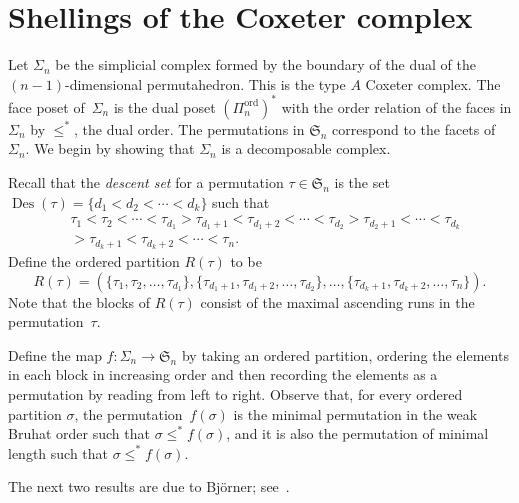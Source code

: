 \documentclass[10pt]{amsart}
\theoremstyle{definition}
\newcommand{\Sym}{\mathfrak{S}}
\DeclareMathOperator{\Des}{Des}
\DeclareMathOperator{\ord}{ord}
\newcommand{\Qn}{\Pi^{\ord}_{n}}
\begin{document}
\section{Shellings of the Coxeter complex}
\label{section_shellings_of_Coxeter_complex}


Let $\Sigma_{n}$ be the simplicial complex formed by
the boundary of the dual of the $(n-1)$-dimensional permutahedron.
This is the type $A$ Coxeter complex.
The face poset of~$\Sigma_{n}$ is the dual poset $(\Qn)^{*}$
with the order relation of the faces in $\Sigma_{n}$ by $\leq^{*}$,
the dual order.
The permutations in $\Sym_{n}$ correspond to
the facets of $\Sigma_{n}$.
We begin by showing that $\Sigma_{n}$ is a decomposable complex.

Recall that the \emph{descent set} 
for a permutation $\tau \in \Sym_{n}$
is the set $\Des(\tau) = \{d_{1} < d_{2} < \cdots < d_{k}\}$
such that
\begin{align*}
& \tau_{1} < \tau_{2} < \cdots < \tau_{d_{1}}
>
\tau_{d_{1}+1} < \tau_{d_{1}+2} < \cdots < \tau_{d_{2}}
>
\tau_{d_{2}+1}
< 
\cdots 
<
\tau_{d_{k}} \\
& >
\tau_{d_{k}+1} < \tau_{d_{k}+2} < \cdots < \tau_{n} .
\end{align*}
Define the ordered partition $R(\tau)$ to be
$$
R(\tau)
= 
(\{\tau_{1}, \tau_{2}, \ldots, \tau_{d_{1}}\},
\{\tau_{d_{1}+1}, \tau_{d_{1}+2}, \ldots, \tau_{d_{2}}\},
\ldots,
\{\tau_{d_{k}+1}, \tau_{d_{k}+2}, \ldots, \tau_{n}\}) . 
$$
Note that the blocks of $R(\tau)$ consist of the maximal ascending runs
in the permutation~$\tau$.

Define the map $f : \Sigma_{n} \longrightarrow \Sym_{n}$
by taking an ordered partition,
ordering the elements in each block in increasing order and then
recording the elements as a permutation by reading from left to right.
Observe that, for every ordered partition $\sigma$, the permutation~$f(\sigma)$
is the minimal permutation in the weak Bruhat order
such that $\sigma\leq^* f(\sigma)$, and it is also the permutation of
minimal length such that $\sigma\leq^* f(\sigma)$.

The next two results are due to Bj\"orner;
see~\cite[Theorem~2.1]{Bjorner_II}.
\end{document}
